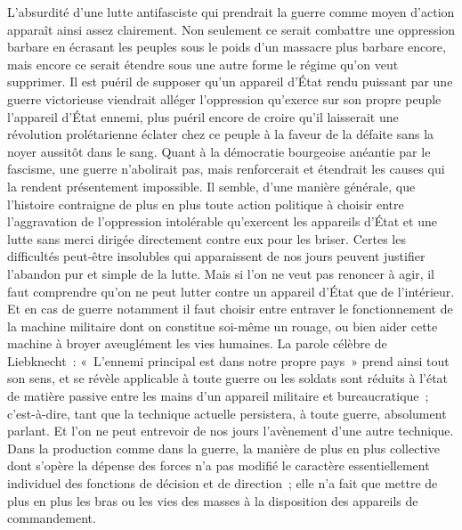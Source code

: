 \documentclass[french,twoside]{book} %
\begin{document}
L'absurdité d'une lutte antifasciste qui prendrait la guerre comme moyen d'action apparaît ainsi assez clairement. Non seulement ce serait combattre une oppression barbare en écrasant les peuples sous le poids d'un massacre plus barbare encore, mais encore ce serait étendre sous une autre forme le régime qu'on veut supprimer. Il est puéril de supposer qu'un appareil d'État rendu puissant par une guerre victorieuse viendrait alléger l'oppression qu'ex­erce sur son propre peuple l'appareil d'État ennemi, plus puéril encore de croire qu'il laisserait une révolution prolétarienne éclater chez ce peuple à la faveur de la défaite sans la noyer aussitôt dans le sang. Quant à la démocratie bourgeoise anéantie par le fascisme, une guerre n'abolirait pas, mais renfor­cerait et étendrait les causes qui la rendent présentement impossible. Il semble, d'une manière générale, que l'histoire contraigne de plus en plus toute action politique à choisir entre l'aggravation de l'oppression intolérable qu'ex­ercent les appareils d'État et une lutte sans merci dirigée directement contre eux pour les briser. Certes les difficultés peut-être insolubles qui apparaissent de nos jours peuvent justifier l'abandon pur et simple de la lutte. Mais si l'on ne veut pas renoncer à agir, il faut comprendre qu'on ne peut lutter contre un appareil d'État que de l'intérieur. Et en cas de guerre notamment il faut choisir entre entraver le fonctionnement de la machine militaire dont on constitue soi-même un rouage, ou bien aider cette machine à broyer aveuglément les vies humaines. La parole célèbre de Liebknecht : « L'ennemi principal est dans notre propre pays » prend ainsi tout son sens, et se révèle applicable à toute guerre ou les soldats sont réduits à l'état de matière passive entre les mains d'un appareil militaire et bureaucratique ; c'est-à-dire, tant que la technique actuelle persistera, à toute guerre, absolument parlant. Et l'on ne peut entrevoir de nos jours l'avènement d'une autre technique. Dans la production comme dans la guerre, la manière de plus en plus collective dont s'opère la dépense des forces n'a pas modifié le caractère essentiellement individuel des fonctions de décision et de direction ; elle n'a fait que mettre de plus en plus les bras ou les vies des masses à la disposition des appareils de commandement.\par
\end{document}
